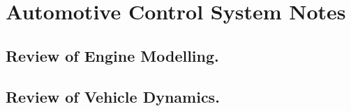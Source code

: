 \section{Automotive Control System Notes}

\subsection{Review of Engine Modelling.}
\subsection{Review of Vehicle Dynamics.}
